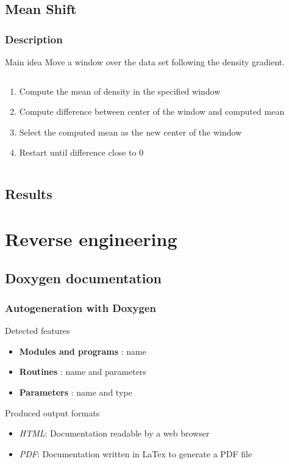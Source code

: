 \documentclass[10p]{beamer}
\begin{document}
\subsection{Mean Shift}
\begin{frame}
\frametitle{Description}
\begin{block}{Main idea}
Move a window over the data set following the density gradient.
\end{block}
\begin{columns}
\begin{column}{0.6\textwidth}
\begin{enumerate}
\item Compute the mean of density in the specified window
\item Compute difference between center of the window and computed mean
\item Select the computed mean as the new center of the window
\item Restart until difference close to 0
\end{enumerate}
\end{column}
\begin{column}{0.4\textwidth}
\end{column}
\end{columns}
\end{frame}
\subsection{Results}
\begin{frame}

\end{frame}
\section{Reverse engineering}
\subsection{Doxygen documentation}
\begin{frame}
\frametitle{Autogeneration with Doxygen}
\begin{block}{Detected features}
\begin{itemize}
\item \textbf{Modules and programs} : name
\item \textbf{Routines} : name and parameters
\item \textbf{Parameters} : name and type
\end{itemize}
\end{block}
\begin{block}{Produced output formats}
\begin{itemize}
\item \textit{HTML}: Documentation readable by a web browser
\item \textit{PDF}: Documentation written in LaTex to generate a PDF file
\end{itemize}
\end{block}
\end{frame}
\end{document}

